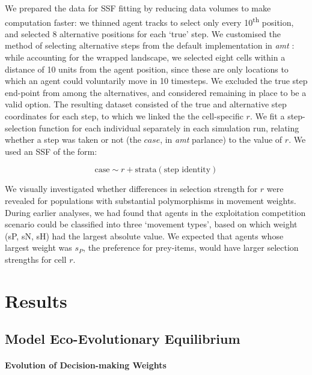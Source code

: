     We prepared the data for SSF fitting by reducing data volumes to make computation faster: we thinned agent tracks to select only every 10\textsuperscript{th} position, and selected 8 alternative positions for each `true' step.
    We customised the method of selecting alternative steps from the default implementation in \textit{amt} \citep{signer2019}: while accounting for the wrapped landscape, we selected eight cells within a distance of 10 units from the agent position, since these are only locations to which an agent could voluntarily move in 10 timesteps.
    We excluded the true step end-point from among the alternatives, and considered remaining in place to be a valid option.
    The resulting dataset consisted of the true and alternative step coordinates for each step, to which we linked the the cell-specific $r$.
    We fit a step-selection function for each individual separately in each simulation run, relating whether a step was taken or not (the $case$, in \textit{amt} parlance) to the value of $r$.
    We used an SSF of the form:
    \begin{linenomath*}
        \begin{equation}
            \text{case} \sim r + \text{strata}(\text{step~identity})
        \end{equation}
    \end{linenomath*}
    We visually investigated whether differences in selection strength for $r$ were revealed for populations with substantial polymorphisms in movement weights.
    During earlier analyses, we had found that agents in the exploitation competition scenario could be classified into three `movement types', based on which weight (sP, sN, sH) had the largest absolute value.
    We expected that agents whose largest weight was $s_P$, the preference for prey-items, would have larger selection strengths for cell $r$.
    
    \section{Results}
    
    \subsection*{Model Eco-Evolutionary Equilibrium}
    
    \paragraph{Evolution of Decision-making Weights}
    

